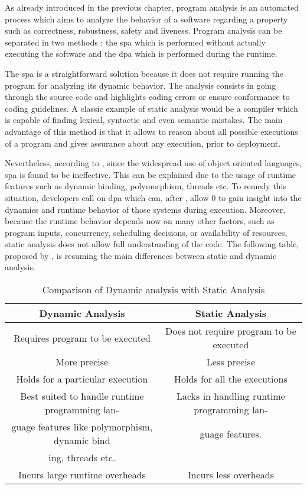 As already introduced in the previous chapter, program analysis is an automated process which aims to analyze the behavior of a software regarding a property such as correctness, robustness, safety and liveness. Program analysis can be separated in two methods : the \gls{spa} which is performed without actually executing the software and the \gls{dpa} which is performed during the runtime. \citep{Wikipedi2016}

The \gls{spa} is a straightforward solution because it does not require running the program for analyzing its dynamic behavior. The analysis consists in going through the source code and highlights coding errors or ensure conformance to coding guidelines. A classic example of static analysis would be a compiler which is capable of finding lexical, syntactic and even semantic mistakes. The main advantage of this method is that it allows to reason about all possible executions of a program and gives assurance about any execution, prior to deployment. 

Nevertheless, according to \cite{Gosain2015}, since the widespread use of object oriented languages, \gls{spa} is found to be ineffective. This can be explained due to the usage of runtime features such as dynamic binding, polymorphism, threads etc. To remedy this situation, developers call on \gls{dpa} which can, after \cite{Marek2015100}, allow 0 to gain insight into the dynamics and runtime behavior of those systems during execution. Moreover, because the runtime behavior depends now on many other factors, such as program inputs, concurrency, scheduling decisions, or availability of resources, static analysis does not allow full understanding of the code. The following table, proposed by \cite{Gosain2015}, is resuming the main differences between static and dynamic analysis.

\bigskip

\begin{table}[htb]
\begin{center}
\begin{tabulary}{\textwidth}{CC}
  \hline
  Dynamic Analysis 	& Static Analysis \\\hline
  Requires program to be executed	& Does not require program to be executed \\
  More precise & Less precise \\
  Holds for a particular execution & Holds for all the executions \\
  Best suited to handle runtime programming lan- & Lacks in handling runtime programming lan-\\
guage features like polymorphism, dynamic bind & guage features.\\
ing, threads etc. &  \\
  Incurs large runtime overheads & Incurs less overheads \\\hline
\end{tabulary}
\end{center}
\caption{Comparison of Dynamic analysis with Static Analysis}
\label{list:comparaison}
\end{table}


